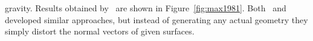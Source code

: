 gravity. Results obtained by~\citeauthor{Max:1981} are shown in
Figure~\ref{fig:max1981}.
%
%
Both~\citet{Schachter:1980} and~\citet{Perlin:1985} developed similar approaches,
but instead of generating any actual geometry they simply distort the normal
vectors of given surfaces.
%
\begin{figure}[t]
 \centering
 \hfill
\end{figure}
